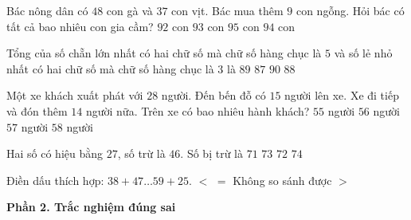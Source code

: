 \begin{ex} %
Bác nông dân có $48$ con gà và $37$ con vịt. Bác mua thêm $9$ con ngỗng. Hỏi bác có tất cả bao nhiêu con gia cầm?
\choice
{$92$ con}
{$93$ con}
{$95$ con}
{\True $94$ con}
\end{ex}

\begin{ex} %
Tổng của số chẵn lớn nhất có hai chữ số mà chữ số hàng chục là $5$ và số lẻ nhỏ nhất có hai chữ số mà chữ số hàng chục là $3$ là
\choice
{\True $89$}
{$87$}
{$90$}
{$88$}
\end{ex}

\begin{ex} %
Một xe khách xuất phát với $28$ người. Đến bến đỗ có $15$ người lên xe. Xe đi tiếp và đón thêm $14$ người nữa. Trên xe có bao nhiêu hành khách?
\choice
{$55$ người}
{$56$ người}
{\True $57$ người}
{$58$ người}
\end{ex}

\begin{ex} %
Hai số có hiệu bằng $27$, số trừ là $46$. Số bị trừ là
\choice
{$71$}
{\True $73$}
{$72$}
{$74$}
\end{ex}

\begin{ex} %
Điền dấu thích hợp: $38 + 47 \dots 59 + 25$.
\choice
{$<$}
{$=$}
{Không so sánh được}
{\True $>$}
\end{ex}

\textbf{Phần 2. Trắc nghiệm đúng sai}


